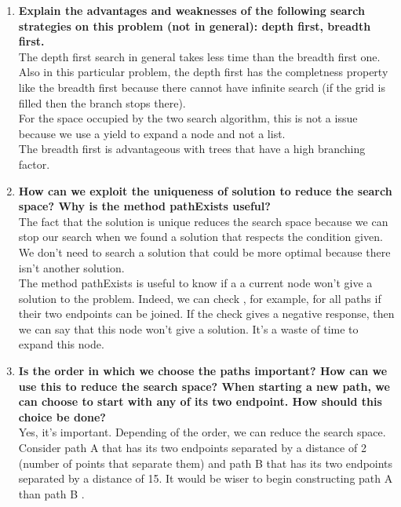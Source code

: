 \documentclass[10pt,a4paper]{article}
\begin{document}
\begin{enumerate}
	
	\item \textbf{ Explain the advantages and weaknesses of the following search strategies on this problem (not in general): depth first, breadth first.} \\
	
	The depth first search in general takes less time than the breadth first one. Also in this particular problem, the depth first has the completness property like the breadth first because there cannot have infinite search (if the grid is filled then the branch stops there). \\
	
	For the space occupied by the two search algorithm, this is not a issue because we use a yield to expand a node and not a list. \\
	
	The breadth first is advantageous with trees that have a high branching factor.
	
	\item \textbf{How can we exploit the uniqueness of solution to reduce the search space? Why is the method pathExists useful?} \\
	
	The fact that the solution is unique reduces the search space because we can stop our search when  we found a solution that respects the condition given. We don't need to search a solution that could be more optimal because there isn't another solution. \\
	
	The method pathExists is useful to know if a a current node won't give a solution to the problem. Indeed, we can check , for example, for all paths if their two endpoints can be joined. If the check gives a negative response, then we can say that this node won't give a solution. It's a waste of time to expand this node.\\	
	
	\item \textbf{Is the order in which we choose the paths important? How can we use this to reduce the search space? When starting a new path, we can choose to start with any of its two endpoint. How should this choice be done?} \\
	
	Yes, it's important. Depending of the order, we can reduce the search space. Consider path A that has its two endpoints separated by a distance of 2 (number of points that separate them) and path B that has its two endpoints separated by a distance of 15. It would be wiser to begin constructing path A than path B .\\
	

\end{enumerate}
\end{document}
